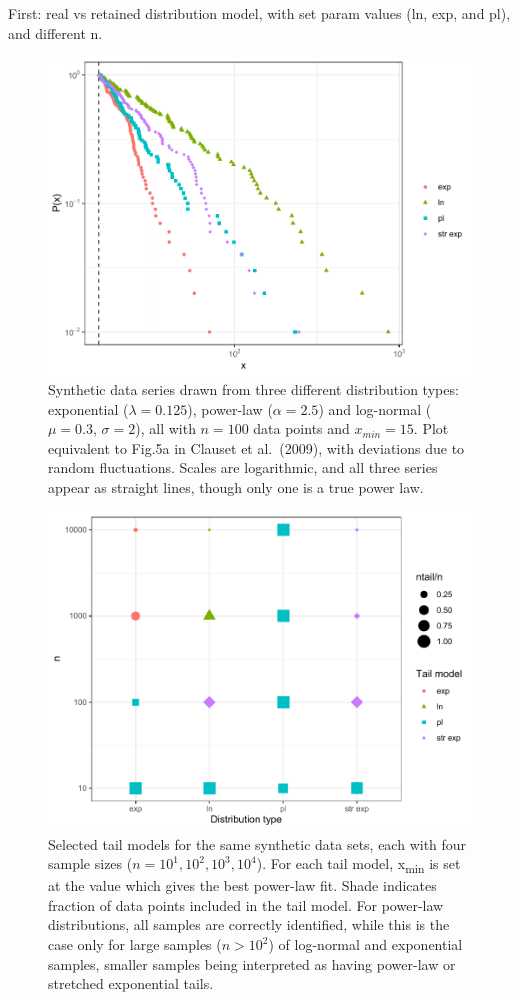 \documentclass[
  12pt,
]{book}
\begin{document}
First: real vs retained distribution model, with set param values (ln, exp, and pl), and different n.



\begin{figure}

{\centering \includegraphics[width=0.7\linewidth]{bookdown-demo_files/figure-latex/05-distfit-1} 

}

\caption{Synthetic data series drawn from three different distribution types: exponential (\(\lambda=0.125\)), power-law (\(\alpha=2.5\)) and log-normal (\(\mu=0.3\), \(\sigma=2\)), all with \(n=100\) data points and \(x_{min}=15\). Plot equivalent to Fig.5a in Clauset et al.~(2009), with deviations due to random fluctuations. Scales are logarithmic, and all three series appear as straight lines, though only one is a true power law.}\label{fig:05-distfit}
\end{figure}



\begin{figure}

{\centering \includegraphics[width=0.7\linewidth]{bookdown-demo_files/figure-latex/05-tails-1} 

}

\caption{Selected tail models for the same synthetic data sets, each with four sample sizes (\(n=10^1, 10^2, 10^3, 10^4\)). For each tail model, x\textsubscript{min} is set at the value which gives the best power-law fit. Shade indicates fraction of data points included in the tail model. For power-law distributions, all samples are correctly identified, while this is the case only for large samples (\(n>10^2\)) of log-normal and exponential samples, smaller samples being interpreted as having power-law or stretched exponential tails.}\label{fig:05-tails}
\end{figure}
\end{document}
